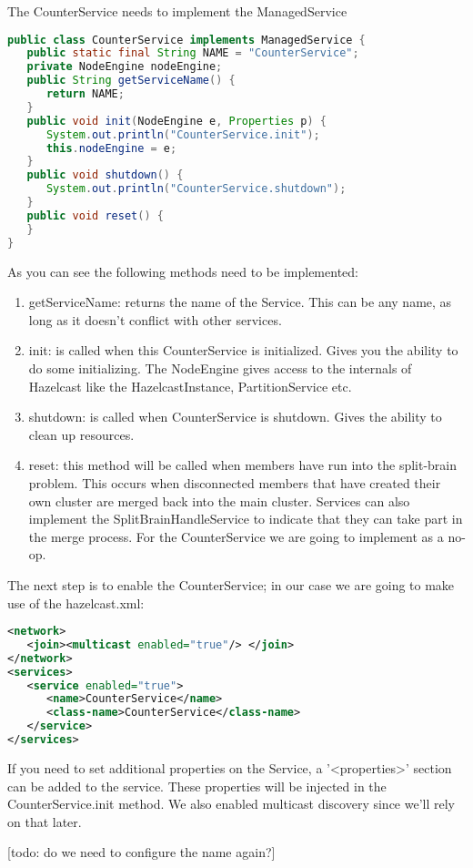 The CounterService needs to implement the ManagedService
\begin{lstlisting}[language=java]
public class CounterService implements ManagedService {
   public static final String NAME = "CounterService";
   private NodeEngine nodeEngine;
   public String getServiceName() {
      return NAME;
   }  
   public void init(NodeEngine e, Properties p) {
      System.out.println("CounterService.init");
      this.nodeEngine = e;
   }
   public void shutdown() {
      System.out.println("CounterService.shutdown");
   }
   public void reset() {
   }
}
\end{lstlisting}
As you can see the following methods need to be implemented: 
\begin{enumerate}
\item getServiceName: returns the name of the Service. This can be any name, as long as it doesn't conflict with other services.
\item init: is called when this CounterService is initialized. Gives you the ability to do some initializing. The NodeEngine gives access to the internals of Hazelcast like the HazelcastInstance, PartitionService etc.
\item shutdown: is called when CounterService is shutdown. Gives the ability to clean up resources.
\item reset: this method will be called when members have run into the split-brain problem. This occurs when disconnected members that have created their own cluster are merged back into the main cluster. Services can also implement the SplitBrainHandleService to indicate that they can take part in the merge process. For the CounterService we are going to implement as a no-op.
\end{enumerate}

The next step is to enable the CounterService; in our case we are going to make use of the hazelcast.xml:
\begin{lstlisting}[language=xml]
<network>
   <join><multicast enabled="true"/> </join>
</network>
<services>
   <service enabled="true">
      <name>CounterService</name>
      <class-name>CounterService</class-name>
   </service>
</services>
\end{lstlisting}
If you need to set additional properties on the Service, a '<properties>' section can be added to the service. These properties will be injected in the CounterService.init method. We also enabled multicast discovery since we'll rely on that later.

[todo: do we need to configure the name again?]

